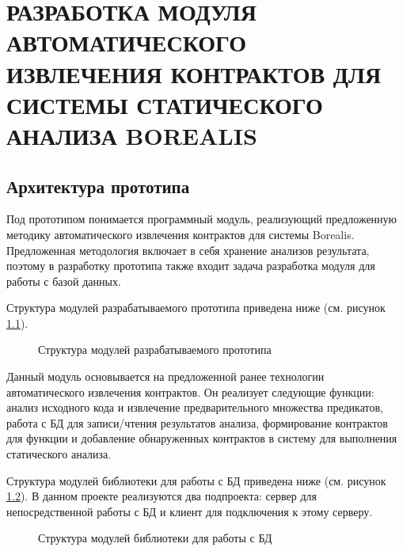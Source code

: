 \chapter{РАЗРАБОТКА МОДУЛЯ АВТОМАТИЧЕСКОГО ИЗВЛЕЧЕНИЯ КОНТРАКТОВ ДЛЯ СИСТЕМЫ СТАТИЧЕСКОГО АНАЛИЗА BOREALIS}
\label{chapter:developing}

\section{Архитектура прототипа}
Под прототипом понимается программный модуль, реализующий предложенную методику автоматического извлечения контрактов для системы Borealis. Предложенная методология включает в себя хранение анализов результата, поэтому в разработку прототипа  также входит задача разработка модуля для работы с базой данных.

Структура модулей разрабатываемого прототипа приведена ниже (см. рисунок \ref{image:borealisStructure}).
\begin{figure}[h!]
\caption{Структура модулей разрабатываемого прототипа}
\label{image:borealisStructure}
\end{figure}

Данный модуль основывается на предложенной ранее технологии автоматического извлечения контрактов. Он реализует следующие функции: анализ исходного кода и извлечение предварительного множества предикатов, работа с БД для записи/чтения результатов анализа, формирование контрактов для функции и добавление обнаруженных контрактов в систему для выполнения статического анализа.

Структура модулей библиотеки для работы с БД приведена ниже (см. рисунок \ref{image:leveldbStructure}). В данном проекте реализуются два подпроекта: сервер для непосредственной работы с БД и клиент для подключения к этому серверу.
\begin{figure}[h!]
\caption{Структура модулей библиотеки для работы с БД}
\label{image:leveldbStructure}
\end{figure}

